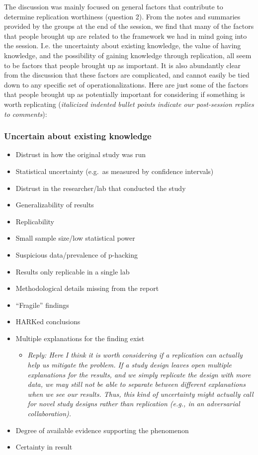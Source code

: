 \documentclass[
]{article}
\providecommand{\tightlist}{%
  \setlength{\itemsep}{0pt}\setlength{\parskip}{0pt}}
\begin{document}
The discussion was mainly focused on general factors that contribute to
determine replication worthiness (question 2). From the notes and
summaries provided by the groups at the end of the session, we find that
many of the factors that people brought up are related to the framework
we had in mind going into the session. I.e. the uncertainty about
existing knowledge, the value of having knowledge, and the possibility
of gaining knowledge through replication, all seem to be factors that
people brought up as important. It is also abundantly clear from the
discussion that these factors are complicated, and cannot easily be tied
down to any specific set of operationalizations. Here are just some of
the factors that people brought up as potentially important for
considering if something is worth replicating (\emph{italicized indented
bullet points indicate our post-session replies to comments}):

\hypertarget{uncertain-about-existing-knowledge}{%
\subsubsection{Uncertain about existing
knowledge}\label{uncertain-about-existing-knowledge}}

\begin{itemize}
\item
  Distrust in how the original study was run
\item
  Statistical uncertainty (e.g.~as measured by confidence intervals)
\item
  Distrust in the researcher/lab that conducted the study
\item
  Generalizability of results
\item
  Replicability
\item
  Small sample size/low statistical power
\item
  Suspicious data/prevalence of p-hacking
\item
  Results only replicable in a single lab
\item
  Methodological details missing from the report
\item
  ``Fragile'' findings
\item
  HARKed conclusions
\item
  Multiple explanations for the finding exist

  \begin{itemize}
  \tightlist
  \item
    \emph{Reply: Here I think it is worth considering if a replication
    can actually help us mitigate the problem. If a study design leaves
    open multiple explanations for the results, and we simply replicate
    the design with more data, we may still not be able to separate
    between different explanations when we see our results. Thus, this
    kind of uncertainty might actually call for novel study designs
    rather than replication (e.g., in an adversarial collaboration).}
  \end{itemize}
\item
  Degree of available evidence supporting the phenomenon
\item
  Certainty in result
\end{itemize}
\end{document}
